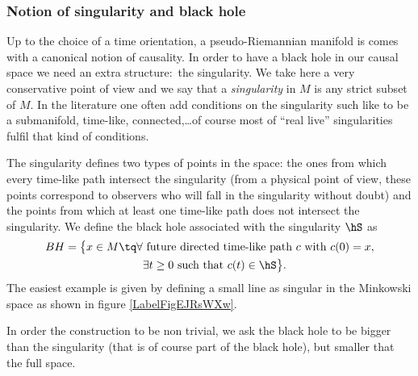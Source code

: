 \subsubsection{Notion of singularity and black hole}

Up to the choice of a time orientation, a pseudo-Riemannian manifold is comes with a canonical notion of causality. In order to have a black hole in our causal space we need an extra structure:~the singularity. We take here a very conservative point of view and we say that a \emph{singularity} in $M$ is any strict subset of $M$. In the literature one often add conditions on the singularity such like to be a submanifold, time-like, connected,\ldots of course most of ``real live'' singularities fulfil that kind of conditions.

The singularity defines two types of points in the space: the ones from which every time-like path intersect the singularity (from a physical point of view, these points correspond to observers who will fall in the singularity without doubt) and the points from which at least one time-like path does not intersect the singularity. We define the black hole associated with the singularity $\hS$ as
\begin{align} 
  BH=\big\{ x\in M\tq \forall &\text{ future directed time-like path } c \text{ with } c(0)=x,\\
			&\exists t\geq0  \text{ such that } c(t)\in \hS \big\}.
\end{align}
The easiest example is given by defining a small line as singular in the Minkowski space as shown in figure \ref{LabelFigEJRsWXw}. 
\newcommand{\CaptionFigEJRsWXw}{The red line is the singularity and the green zone is the black hole associated with.}


In order the construction to be non trivial, we ask the black hole to be bigger than the singularity (that is of course part of the black hole), but smaller that the full space.


